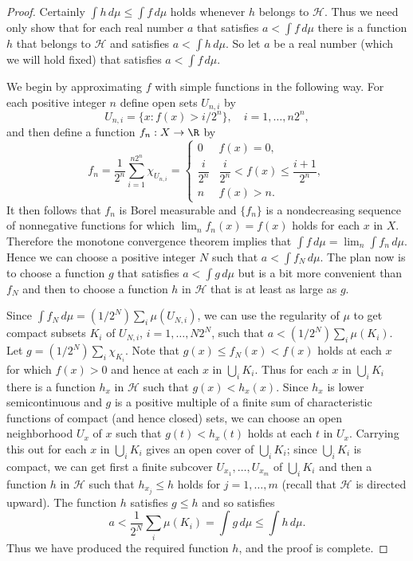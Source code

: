 \begin{proof}
Certainly $\int h\,d\mu\leq\int f\,d\mu$ holds whenever $h$ belongs to $\mathscr{H}$. Thus we need only show that for each real number $a$ that satisfies $a<\int f\,d\mu$ there is a function $h$ that belongs to $\mathscr{H}$ and satisfies $a<\int h\,d\mu$. So let $a$ be a real number (which we will hold fixed) that satisfies $a<\int f\,d\mu$.\par
We begin by approximating $f$ with simple functions in the following way. For each positive integer $n$ define open sets $U_{n,i}$ by
\[U_{n,i}=\{x:f(x)>i/2^n\},\quad i=1,\dots,n2^n,\]
and then define a function $f_n:X\to\R$ by
\[f_n=\frac{1}{2^n}\sum_{i=1}^{n2^n}\chi_{U_{n,i}}=\begin{cases}
0&f(x)=0,\\[8pt]
\dfrac{i}{2^n}&\dfrac{i}{2^n}<f(x)\leq\dfrac{i+1}{2^n},\\[8pt]
n&f(x)>n.
\end{cases}\]
It then follows that $f_n$ is Borel measurable and $\{f_n\}$ is a nondecreasing sequence of nonnegative functions for which $\lim_nf_n(x)=f(x)$ holds for each $x$ in $X$. Therefore the monotone convergence theorem implies that $\int f\,d\mu=\lim_n\int f_n\,d\mu$. Hence we can choose a positive integer $N$ such that $a<\int f_N\,d\mu$. The plan now is to choose a function $g$ that satisfies $a<\int g\,d\mu$ but is a bit more convenient than $f_N$ and then to choose a function $h$ in $\mathscr{H}$ that is at least as large as $g$.\par
Since $\int f_N\,d\mu=(1/2^N)\sum_{i}\mu(U_{N,i})$, we can use the regularity of $\mu$ to get compact subsets $K_i$ of $U_{N,i}$, $i=1,\dots, N2^N$, such that $a<(1/2^N)\sum_i\mu(K_i)$. Let $g=(1/2^N)\sum_i\chi_{K_i}$. Note that $g(x)\leq f_N(x)<f(x)$ holds at each $x$ for which $f(x)>0$ and hence at each $x$ in $\bigcup_iK_i$. Thus for each $x$ in $\bigcup_iK_i$ there is a function $h_x$ in $\mathscr{H}$ such that $g(x)<h_x(x)$. Since $h_x$ is lower semicontinuous and $g$ is a positive multiple of a finite sum of characteristic functions of compact (and hence closed) sets, we can choose an open neighborhood $U_x$ of $x$ such that $g(t)<h_x(t)$ holds at each $t$ in $U_x$. Carrying this out for each $x$ in $\bigcup_iK_i$ gives an open cover of $\bigcup_iK_i$; since $\bigcup_iK_i$ is compact, we can get first a finite subcover $U_{x_1},\dots,U_{x_m}$ of $\bigcup_iK_i$ and then a function $h$ in $\mathscr{H}$ such that $h_{x_j}\leq h$ holds for $j=1,\dots,m$ (recall that $\mathscr{H}$ is directed upward). The function $h$ satisfies $g\leq h$ and so satisfies
\[a<\frac{1}{2^N}\sum_i\mu(K_i)=\int g\,d\mu\leq\int h\,d\mu.\]
Thus we have produced the required function $h$, and the proof is complete.
\end{proof}

